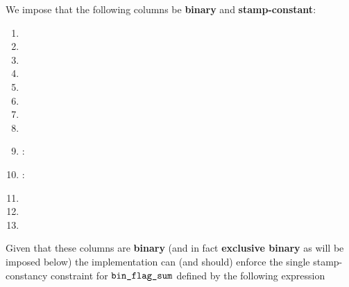 We impose that the following columns be \textbf{binary} and \textbf{stamp-constant}:
\begin{multicols}{2}
    \begin{enumerate}
	\item \mmuInstFlagMload{}
	\item \mmuInstFlagMstore{}
	\item \mmuInstFlagMstoreEight{}
	\item \mmuInstFlagInvalidCodePrefix{}
	\item \mmuInstFlagRightPaddedWordExtraction{}
	\item \mmuInstFlagRamToExoWithPadding{}
	\item \mmuInstFlagExoToRamTransplants{}
	\item \mmuInstFlagRamToRamSansPadding{}
	\item \mmuInstFlagAnyToRamWithPaddingSomeData{}:
	\item \mmuInstFlagAnyToRamWithPaddingPurePadding{}:
	\item \mmuInstFlagModexpZero{}
	\item \mmuInstFlagModexpData{}
	\item \mmuInstFlagBlake{}
    \end{enumerate}
\end{multicols}
\saNote{} Given that these columns are \textbf{binary} (and in fact \textbf{exclusive binary} as will be imposed below)
the implementation can (and should) enforce the single stamp-constancy constraint for $\texttt{bin\_flag\_sum}$ defined by the following expression
